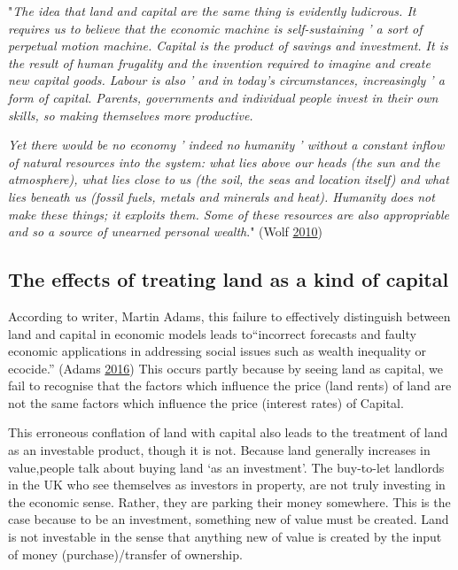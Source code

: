 \documentclass[]{tufte-handout}
\begin{document}
"\emph{The idea that land and capital are the same thing is evidently
ludicrous. It requires us to believe that the economic machine is
self-sustaining ' a sort of perpetual motion machine. Capital is the
product of savings and investment. It is the result of human frugality
and the invention required to imagine and create new capital goods.
Labour is also ' and in today's circumstances, increasingly ' a form of
capital. Parents, governments and individual people invest in their own
skills, so making themselves more productive.}

\emph{Yet there would be no economy ' indeed no humanity ' without a
constant inflow of natural resources into the system: what lies above
our heads (the sun and the atmosphere), what lies close to us (the soil,
the seas and location itself) and what lies beneath us (fossil fuels,
metals and minerals and heat). Humanity does not make these things; it
exploits them. Some of these resources are also appropriable and so a
source of unearned personal wealth}." (Wolf
\protect\hyperlink{ref-Wolf2010}{2010})

\hypertarget{the-effects-of-treating-land-as-a-kind-of-capital}{%
\subsection{The effects of treating land as a kind of
capital}\label{the-effects-of-treating-land-as-a-kind-of-capital}}

According to writer, Martin Adams, this failure to effectively
distinguish between land and capital in economic models leads
to``incorrect forecasts and faulty economic applications in addressing
social issues such as wealth inequality or ecocide.'' (Adams
\protect\hyperlink{ref-Adams2016}{2016}) This occurs partly because by
seeing land as capital, we fail to recognise that the factors which
influence the price (land rents) of land are not the same factors which
influence the price (interest rates) of Capital.

This erroneous conflation of land with capital also leads to the
treatment of land as an investable product, though it is not. Because
land generally increases in value,people talk about buying land `as an
investment'. The buy-to-let landlords in the UK who see themselves as
investors in property, are not truly investing in the economic sense.
Rather, they are parking their money somewhere. This is the case because
to be an investment, something new of value must be created. Land is not
investable in the sense that anything new of value is created by the
input of money (purchase)/transfer of ownership.
\end{document}

